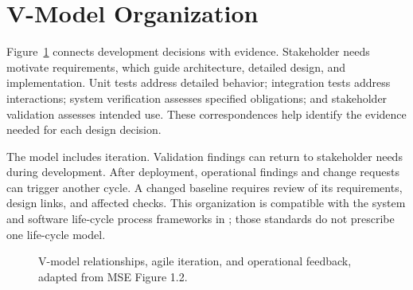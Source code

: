 \section{V-Model Organization}
Figure~\ref{Figure:VModel} connects development decisions with evidence.
Stakeholder needs motivate requirements, which guide architecture, detailed
design, and implementation. Unit tests address detailed behavior; integration
tests address interactions; system verification assesses specified obligations;
and stakeholder validation assesses intended use. These correspondences help
identify the evidence needed for each design decision.

The model includes iteration. Validation findings can return to stakeholder
needs during development. After deployment, operational findings and change
requests can trigger another cycle. A changed baseline requires review of its
requirements, design links, and affected checks. This organization is
compatible with the system and software life-cycle process frameworks in
\cite{ISO15288,ISO12207}; those standards do not prescribe one life-cycle model.

\begin{figure}[htbp]
\centering
\resizebox{\textwidth}{!}{}
\caption{V-model relationships, agile iteration, and operational feedback, adapted from MSE Figure 1.2.}
\label{Figure:VModel}
\end{figure}
